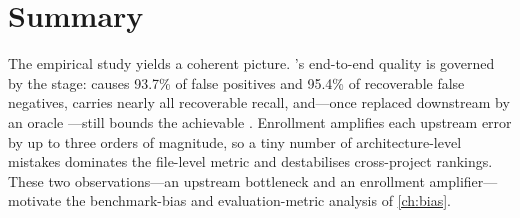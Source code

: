 

\section{Summary}
\label{sec:transarc:summary}

The empirical study yields a coherent picture. \transarc's end-to-end quality is
governed by the \sadsam stage: \sadsam causes 93.7\% of false positives and
95.4\% of recoverable false negatives, carries nearly all recoverable recall,
and---once replaced downstream by an oracle \samcode---still bounds the
achievable \fone. Enrollment amplifies each upstream error by up to three orders
of magnitude, so a tiny number of architecture-level mistakes dominates the
file-level metric and destabilises cross-project rankings. These two
observations---an upstream bottleneck and an enrollment amplifier---motivate the
benchmark-bias and evaluation-metric analysis of \cref{ch:bias}.
